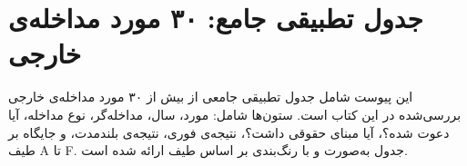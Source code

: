 \chapter{جدول تطبیقی جامع: ۳۰ مورد مداخله‌ی خارجی}
\label{app:comparative-table}

\begin{tcolorbox}[mybox, title={درباره‌ی این پیوست}]
این پیوست شامل جدول تطبیقی جامعی از بیش از ۳۰ مورد مداخله‌ی خارجی بررسی‌شده در این کتاب است. ستون‌ها شامل: مورد، سال، مداخله‌گر، نوع مداخله، آیا دعوت شده؟، آیا مبنای حقوقی داشت؟، نتیجه‌ی فوری، نتیجه‌ی بلندمدت، و جایگاه بر طیف A تا F. جدول به‌صورت  و با رنگ‌بندی بر اساس طیف ارائه شده است.
\end{tcolorbox}

